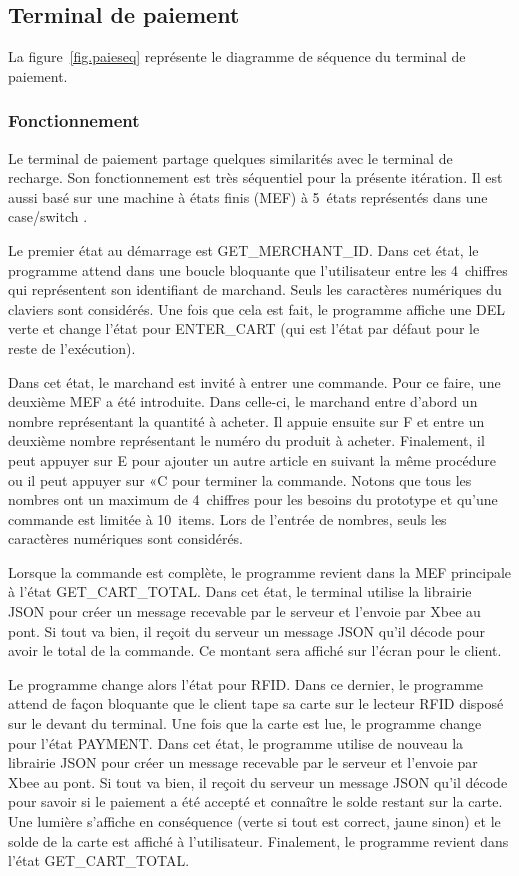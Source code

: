 	\clearpage
	\subsection{Terminal de paiement}
	La figure~\ref{fig.paieseq} représente le diagramme de séquence du terminal de paiement.
		\subsubsection{Fonctionnement}
		Le terminal de paiement partage quelques similarités avec le terminal de recharge. Son fonctionnement est très séquentiel pour la présente itération. Il est aussi basé sur une machine à états finis (MEF) à 5~états représentés dans une \og case/switch \fg{}.
		
		Le premier état au démarrage est GET\_MERCHANT\_ID. Dans cet état, le programme attend dans une boucle bloquante que l’utilisateur entre les 4~chiffres qui représentent son identifiant de marchand. Seuls les caractères numériques du claviers sont considérés. Une fois que cela est fait, le programme affiche une DEL verte et change l’état pour ENTER\_CART (qui est l’état par défaut pour le reste de l’exécution).

		Dans cet état, le marchand est invité à entrer une commande. Pour ce faire, une deuxième MEF a été introduite. Dans celle-ci, le marchand entre d’abord un nombre représentant la quantité à acheter. Il appuie ensuite sur \og F \fg{} et entre un deuxième nombre représentant le numéro du produit à acheter. Finalement, il peut appuyer sur \og E \fg{} pour ajouter un autre article en suivant la même procédure ou il peut appuyer sur «\og C \fg{} pour terminer la commande. Notons que tous les nombres ont un maximum de 4~chiffres pour les besoins du prototype et qu’une commande est limitée à 10~items. Lors de l’entrée de nombres, seuls les caractères numériques sont considérés.

		Lorsque la commande est complète, le programme revient dans la MEF principale à l’état GET\_CART\_TOTAL. Dans cet état, le terminal utilise la librairie JSON pour créer un message recevable par le serveur et l’envoie par Xbee au pont. Si tout va bien, il reçoit du serveur un message JSON qu’il décode pour avoir le total de la commande. Ce montant sera affiché sur l’écran pour le client.

		Le programme change alors l’état pour RFID. Dans ce dernier, le programme attend de façon bloquante que le client tape sa carte sur le lecteur RFID disposé sur le devant du terminal. Une fois que la carte est lue, le programme change pour l’état PAYMENT. Dans cet état, le programme utilise de nouveau la librairie JSON pour créer un message recevable par le serveur et l’envoie par Xbee au pont.  Si tout va bien, il reçoit du serveur un message JSON qu’il décode pour savoir si le paiement a été accepté et connaître le solde restant sur la carte. Une lumière s’affiche en conséquence (verte si tout est correct, jaune sinon) et le solde de la carte est affiché à l’utilisateur. Finalement, le programme revient dans l’état GET\_CART\_TOTAL.

